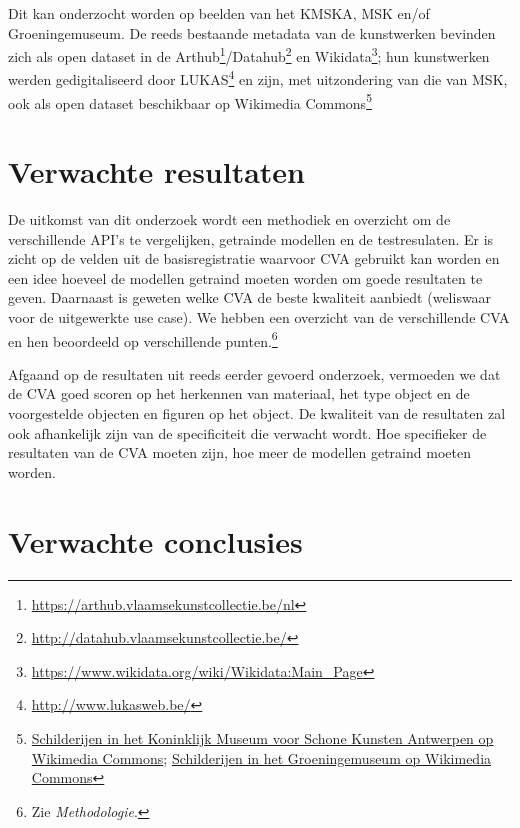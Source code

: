 \documentclass[fleqn,10pt]{voorstel}
\begin{document}
Dit kan onderzocht worden op beelden van het KMSKA, MSK en/of Groeningemuseum. De reeds bestaande metadata van de kunstwerken bevinden zich als open dataset in de Arthub\footnote{\url{https://arthub.vlaamsekunstcollectie.be/nl}}/Datahub\footnote{\url{http://datahub.vlaamsekunstcollectie.be/}} en Wikidata\footnote{\url{https://www.wikidata.org/wiki/Wikidata:Main_Page}}; hun kunstwerken werden gedigitaliseerd door LUKAS\footnote{\url{http://www.lukasweb.be/}} en zijn, met uitzondering van die van MSK, ook als open dataset beschikbaar op Wikimedia Commons\footnote{\href{https://commons.wikimedia.org/wiki/Paintings_in_the_Royal_Museum_of_Fine_Arts_Antwerp}{Schilderijen in het Koninklijk Museum voor Schone Kunsten Antwerpen op Wikimedia Commons}; \href{https://commons.wikimedia.org/wiki/Paintings_in_the_Groeningemuseum}{Schilderijen in het Groeningemuseum op Wikimedia Commons}}

\section{Verwachte resultaten}
\label{sec:verwachte_resultaten}

De uitkomst van dit onderzoek wordt een methodiek en overzicht om de verschillende API's te vergelijken, getrainde modellen en de testresulaten. Er is zicht op de velden uit de basisregistratie waarvoor CVA gebruikt kan worden en een idee hoeveel de modellen getraind moeten worden om goede resultaten te geven. Daarnaast is geweten welke CVA de beste kwaliteit aanbiedt (weliswaar voor de uitgewerkte use case). We hebben een overzicht van de verschillende CVA en hen beoordeeld op verschillende punten.\footnote{Zie \emph{Methodologie}.} 

Afgaand op de resultaten uit reeds eerder gevoerd onderzoek, vermoeden we dat de CVA goed scoren op het herkennen van materiaal, het type object en de voorgestelde objecten en figuren op het object. De kwaliteit van de resultaten zal ook afhankelijk zijn van de specificiteit die verwacht wordt. Hoe specifieker de resultaten van de CVA moeten zijn, hoe meer de modellen getraind moeten worden.

\section{Verwachte conclusies}
\label{sec:verwachte_conclusies}
\end{document}
